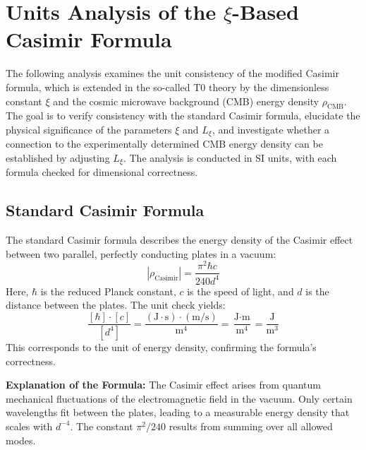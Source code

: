 \documentclass{article}
\begin{document}
	
	\section{Units Analysis of the $\xi$-Based Casimir Formula}
	The following analysis examines the unit consistency of the modified Casimir formula, which is extended in the so-called T0 theory by the dimensionless constant $\xi$ and the cosmic microwave background (CMB) energy density $\rho_{\text{CMB}}$. The goal is to verify consistency with the standard Casimir formula, elucidate the physical significance of the parameters $\xi$ and $L_\xi$, and investigate whether a connection to the experimentally determined CMB energy density can be established by adjusting $L_\xi$. The analysis is conducted in SI units, with each formula checked for dimensional correctness.
	
	\subsection{Standard Casimir Formula}
	The standard Casimir formula describes the energy density of the Casimir effect between two parallel, perfectly conducting plates in a vacuum:
	\begin{equation}
		|\rho_{\text{Casimir}}| = \frac{\pi^2 \hbar c}{240 d^4}
	\end{equation}
	Here, $\hbar$ is the reduced Planck constant, $c$ is the speed of light, and $d$ is the distance between the plates. The unit check yields:
	\begin{equation}
		\frac{[\hbar] \cdot [c]}{[d^4]} = \frac{(\text{J} \cdot \text{s}) \cdot (\text{m}/\text{s})}{\text{m}^4} = \frac{\text{J} \cdot \text{m}}{\text{m}^4} = \frac{\text{J}}{\text{m}^3}
	\end{equation}
	This corresponds to the unit of energy density, confirming the formula's correctness.
	
	\textbf{Explanation of the Formula:} The Casimir effect arises from quantum mechanical fluctuations of the electromagnetic field in the vacuum. Only certain wavelengths fit between the plates, leading to a measurable energy density that scales with $d^{-4}$. The constant $\pi^2/240$ results from summing over all allowed modes.
	
\end{document}
